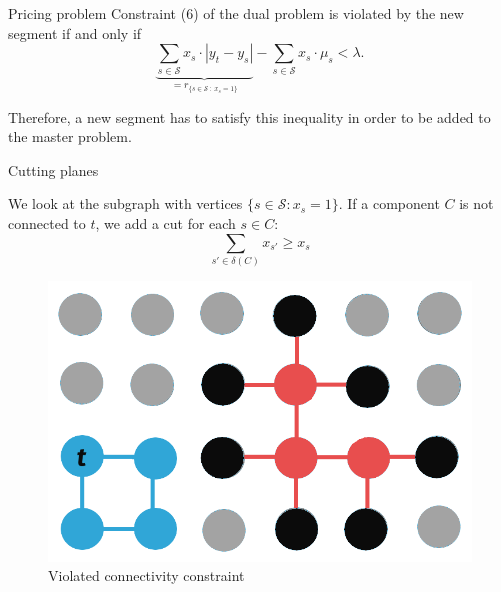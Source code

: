 \documentclass[fleqn]{beamer}
\newcommand{\superpixels}{\mathcal{S}}
\begin{document}
	\begin{frame}{Pricing problem}
		Constraint (6) of the dual problem is violated by the new segment if and only if
		\[\underbrace{\sum_{s\in\superpixels} x_s\cdot|y_t-y_s|}_{=r_{\{s\in\superpixels\ :\ x_s=1\}}} - \sum_{s\in\superpixels} x_s\cdot\mu_s < \lambda.\]
        
		Therefore, a new segment has to satisfy this inequality in order to be added to the master problem.
	\end{frame}
    
	\begin{frame}{Cutting planes}
		
        
		We look at the subgraph with vertices $\{s\in\superpixels:x_s=1\}$.
        If a component $C$ is not connected to $t$,
        we add a cut for each $s\in C$:
        \[\sum_{s'\in\delta(C)}x_{s'} \geq x_s\]
        
        \begin{figure}
            \centering
            \includegraphics[scale=.2]{cuttingplanes.png}
            \caption{Violated connectivity constraint}
        \end{figure}
	\end{frame}
	
\end{document}
